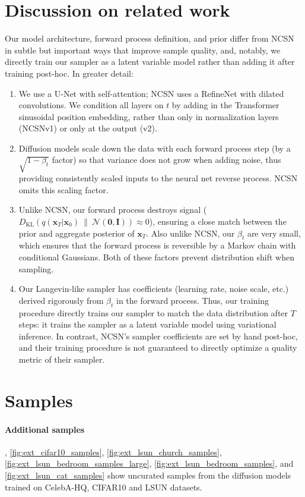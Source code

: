 \documentclass{article}
\newcommand{\kl}[2]{D_{\mathrm{KL}}\!\left(#1 ~ \| ~ #2\right)}
\newcommand{\bI}{\mathbf{I}}
\newcommand{\bzero}{\mathbf{0}}
\newcommand{\bx}{\mathbf{x}}
\begin{document}
\section{Discussion on related work}
\label{sec:extended_related_work}

Our model architecture, forward process definition, and prior differ from NCSN~\citep{song2019generative,song2020improved} in subtle but important ways that improve sample quality, and, notably, we directly train our sampler as a latent variable model rather than adding it after training post-hoc. In greater detail:
\begin{enumerate}
  \item We use a U-Net with self-attention; NCSN uses a RefineNet with dilated convolutions.
We condition all layers on $t$ by adding in the Transformer sinusoidal position embedding, rather than only in normalization layers (NCSNv1) or only at the output (v2).
  \item Diffusion models scale down the data with each forward process step (by a $\sqrt{1-\beta_t}$ factor) so that variance does not grow when adding noise, thus providing consistently scaled inputs to the neural net reverse process. NCSN omits this scaling factor.
  \item Unlike NCSN, our forward process destroys signal ($\kl{q(\bx_T|\bx_0)}{\mathcal{N}(\bzero,\bI)} \approx 0$), ensuring a close match between the prior and aggregate posterior of $\bx_T$.
Also unlike NCSN, our $\beta_t$ are very small, which ensures that the forward process is reversible by a Markov chain with conditional Gaussians. Both of these factors prevent distribution shift when sampling.
  \item Our Langevin-like sampler has coefficients  (learning rate, noise scale, etc.)
derived rigorously from $\beta_t$ in the forward process. Thus, our training procedure directly trains our sampler to match the data distribution after $T$ steps: it trains the sampler as a latent variable model using variational inference. In contrast, NCSN's sampler coefficients are set by hand post-hoc, and their training procedure is not guaranteed to directly optimize a quality metric of their sampler.
\end{enumerate}

\section{Samples}
\label{sec:extended_samples}
\paragraph{Additional samples} , \ref{fig:ext_cifar10_samples},
\ref{fig:ext_lsun_church_samples},
\ref{fig:ext_lsun_bedroom_samples_large},
\ref{fig:ext_lsun_bedroom_samples},
and \ref{fig:ext_lsun_cat_samples} show uncurated samples from the diffusion models trained on CelebA-HQ, CIFAR10 and LSUN datasets.
\end{document}
